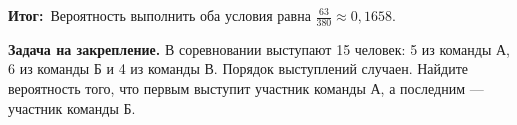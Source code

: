\documentclass[a4paper,12pt]{article}
\newcommand{\outcomelabel}{\textcolor{accent}{\textbf{Итог:}}}
\begin{document}
\outcomelabel\ Вероятность выполнить оба условия равна $\boxed{\frac{63}{380}\approx0{,}1658}$.

\textbf{Задача на закрепление.} В соревновании выступают 15 человек: 5 из команды А, 6 из команды Б и 4 из команды В. Порядок выступлений случаен. Найдите вероятность того, что первым выступит участник команды А, а последним --- участник команды Б.

\endgroup
\end{document}
